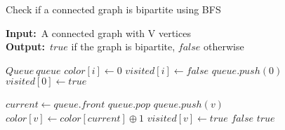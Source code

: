 \documentclass[12pt]{article}
\renewcommand{\algorithmicrequire}{\textbf{Input:}}
\renewcommand{\algorithmicensure}{\textbf{Output:}}
\begin{document}
\begin{algorithm}

  \caption{Check if a connected graph is bipartite using BFS}
  
  \algorithmicrequire \ A connected graph with V vertices\\
  \algorithmicensure \ $true$ if the graph is bipartite, $false$ otherwise
  
  \begin{algorithmic}[1]
    
    \Statex
    
    
    
        \State $Queue\ queue$ 
            \State $color[i] \gets 0$
            \State $visited[i] \gets false$
        \EndFor
        \State $queue.push(0)$
        \State $visited[0] \gets true$
        
        \Statex
         
            \State $current \gets queue.front$
            \State $queue.pop$
             
                    \State $queue.push(v)$
                    \State $color[v] \gets color[current] \oplus 1$ 
                    \State $visited[v] \gets true$
                \Else
                        \State \Return $false$
                    \EndIf
                \EndIf
            \EndFor
        \EndWhile
        \Statex
        \State \Return $true$
    \EndFunction
  \end{algorithmic}
  
\end{algorithm}
\end{document}
